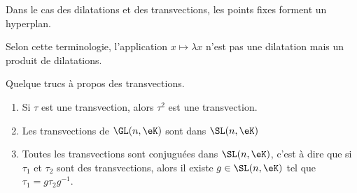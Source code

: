 \begin{normaltext}
	Dans le cas des dilatations et des transvections, les points fixes forment un hyperplan.

	Selon cette terminologie, l'application \( x\mapsto \lambda x\) n'est pas une dilatation mais un produit de dilatations.
\end{normaltext}

\begin{lemma}	\label{LEMooYTUSooKqDJce}
	Quelque trucs à propos des transvections.
	\begin{enumerate}
		\item		\label{ITEMooOGTOooVGYOUA}
		      Si \( \tau\) est une transvection, alors \( \tau^2\) est une transvection.
		\item		\label{ITEMooCSBVooTWYMvd}
		      Les transvections de \( \GL(n,\eK)\) sont dans \( \SL(n,\eK)\)
		\item		\label{ITEMooYQKNooYCbpBP}
		      Toutes les transvections sont conjuguées dans \( \SL(n,\eK)\), c'est à dire que si \( \tau_1\) et \( \tau_2\) sont des transvections, alors il existe \( g\in \SL(n,\eK)\) tel que \( \tau_1=g\tau_2g^{-1}\).
	\end{enumerate}
\end{lemma}

